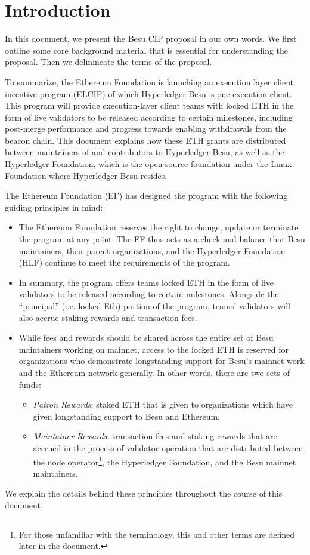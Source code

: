 
\section{Introduction} \label{sec:introduction}

In this document, we present the Besu CIP proposal in our own words.  We first outline some core background material that is essential for understanding the proposal.  Then we delinineate the terms of the proposal.

To summarize, the Ethereum Foundation is launching an execution layer client incentive program (ELCIP) of which Hyperledger Besu is one execution client. This program will provide execution-layer client teams with locked ETH in the form of live validators to be released according to certain milestones, including post-merge performance and progress towards enabling withdrawals from the beacon chain.  This document explains how these ETH grants are distributed between maintainers of and contributors to Hyperledger Besu, as well as the Hyperledger Foundation, which is the open-source foundation under the Linux Foundation where Hyperledger Besu resides.

The Ethereum Foundation (EF) has designed the program with the following guiding principles in mind:

\begin{itemize}
\item The Ethereum Foundation reserves the right to change, update or terminate the program at any point. The EF thus acts as a check and balance that Besu maintainers, their parent organizations, and the Hyperledger Foundation (HLF) continue to meet the requirements of the program.
\item In summary, the program offers teams locked ETH in the form of live validators to be released according to certain milestones. Alongside the “principal” (i.e. locked Eth) portion of the program, teams’ validators will also accrue staking rewards and transaction fees.
\item While fees and rewards should be shared across the entire set of Besu maintainers working on mainnet, access to the locked ETH is reserved for organizations who demonstrate longstanding support for Besu’s mainnet work and the Ethereum network generally.  In other words, there are two sets of funds:
\begin{itemize}
\item \emph{Patron Rewards}:  staked ETH that is given to organizations which have given longstanding support to Besu and Ethereum.
\item \emph{Maintainer Rewards}:  transaction fees and staking rewards that are accrued in the process of validator operation that are distributed between the node operator\footnote{For those unfamiliar with the terminology, this and other terms are defined later in the document.}, the Hyperledger Foundation, and the Besu mainnet maintainers.
\end{itemize}
\end{itemize}
We explain the details behind these principles throughout the course of this document.  

